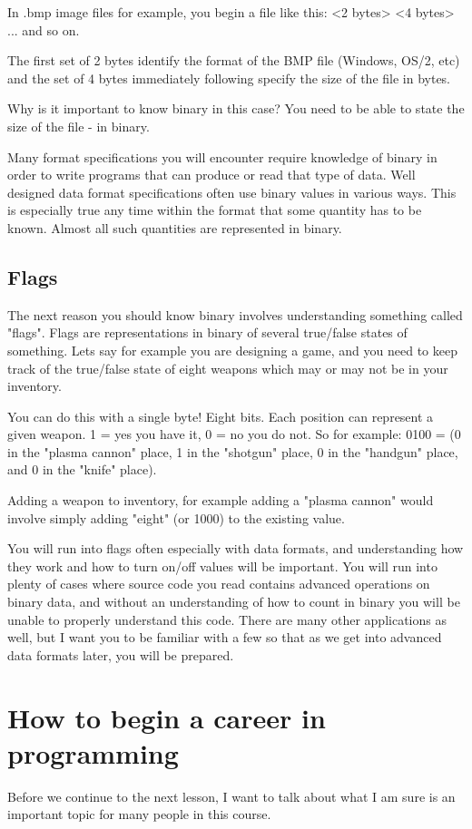 \documentclass[a4paper,12pt]{article}
\let\stdsection\section
\renewcommand\section{\newpage\stdsection}
\begin{document}
In .bmp image files for example, you begin a file like this:
<2 bytes> <4 bytes> ... and so on.

The first set of 2 bytes identify the format of the BMP file (Windows, OS/2, etc) and the set of 4 bytes immediately following specify the size of the file in bytes.

Why is it important to know binary in this case? You need to be able to state the size of the file - in binary.

Many format specifications you will encounter require knowledge of binary in order to write programs that can produce or read that type of data. Well designed data format specifications often use binary values in various ways. This is especially true any time within the format that some quantity has to be known. Almost all such quantities are represented in binary.
\subsection{Flags}
The next reason you should know binary involves understanding something called "flags". Flags are representations in binary of several true/false states of something. Lets say for example you are designing a game, and you need to keep track of the true/false state of eight weapons which may or may not be in your inventory.

You can do this with a single byte! Eight bits. Each position can represent a given weapon. 1 = yes you have it, 0 = no you do not. So for example:
0100 = (0 in the "plasma cannon" place, 1 in the "shotgun" place, 0 in the "handgun" place, and 0 in the "knife" place).

Adding a weapon to inventory, for example adding a "plasma cannon" would involve simply adding "eight" (or 1000) to the existing value.

You will run into flags often especially with data formats, and understanding how they work and how to turn on/off values will be important. You will run into plenty of cases where source code you read contains advanced operations on binary data, and without an understanding of how to count in binary you will be unable to properly understand this code.
There are many other applications as well, but I want you to be familiar with a few so that as we get into advanced data formats later, you will be prepared.
\section{How to begin a career in programming}
Before we continue to the next lesson, I want to talk about what I am sure is an important topic for many people in this course.
\end{document}
